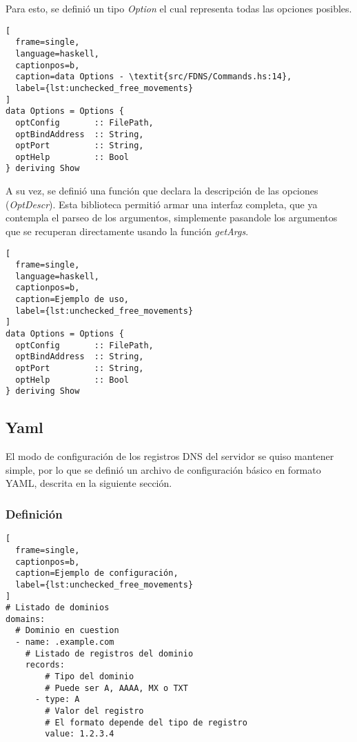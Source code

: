 \documentclass[6pt]{article}
\begin{document}
Para esto, se definió un tipo \textit{Option} el cual representa todas
las opciones posibles.

\begin{lstlisting}[
  frame=single,
  language=haskell,
  captionpos=b,
  caption=data Options - \textit{src/FDNS/Commands.hs:14},
  label={lst:unchecked_free_movements}
]
data Options = Options {
  optConfig       :: FilePath,
  optBindAddress  :: String,
  optPort         :: String,
  optHelp         :: Bool
} deriving Show
\end{lstlisting}

A su vez, se definió una función que declara la descripción de las
opciones (\textit{OptDescr}). Esta biblioteca permitió armar una interfaz
completa, que ya contempla el parseo de los argumentos, simplemente
pasandole los argumentos que se recuperan directamente usando la función
\textit{getArgs}.

\begin{lstlisting}[
  frame=single,
  language=haskell,
  captionpos=b,
  caption=Ejemplo de uso,
  label={lst:unchecked_free_movements}
]
data Options = Options {
  optConfig       :: FilePath,
  optBindAddress  :: String,
  optPort         :: String,
  optHelp         :: Bool
} deriving Show
\end{lstlisting}

\subsection{Yaml \cite{package-yaml}}

El modo de configuración de los registros DNS del servidor se quiso
mantener simple, por lo que se definió un archivo de configuración
básico en formato YAML, descrita en la siguiente sección.

\subsubsection{Definición}

\clearpage
\begin{lstlisting}[
  frame=single,
  captionpos=b,
  caption=Ejemplo de configuración,
  label={lst:unchecked_free_movements}
]
# Listado de dominios
domains:
  # Dominio en cuestion
  - name: .example.com
    # Listado de registros del dominio
    records:
        # Tipo del dominio
        # Puede ser A, AAAA, MX o TXT
      - type: A
        # Valor del registro
        # El formato depende del tipo de registro
        value: 1.2.3.4
\end{lstlisting}
\end{document}
